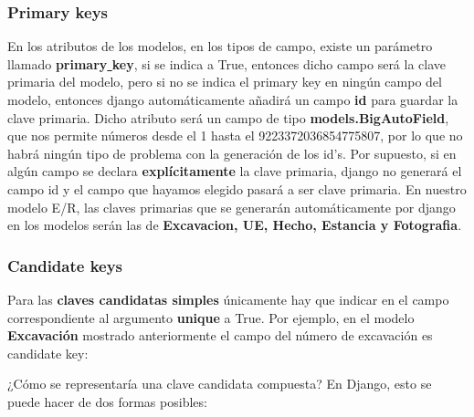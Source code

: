     \subsubsection{Primary keys}
    En los atributos de los modelos, en los tipos de campo, existe un parámetro llamado
    \textbf{primary\underline{ }key}, si se indica a True, entonces dicho campo será la clave
    primaria del modelo, pero si no se indica el primary key en ningún campo del modelo,
    entonces django automáticamente añadirá un campo \textbf{id} para guardar la clave primaria.
    Dicho atributo será un campo de tipo \textbf{models.BigAutoField}, que nos permite números
    desde el 1 hasta el 9223372036854775807, por lo que no habrá ningún tipo de problema con
    la generación de los id's. Por supuesto, si en algún campo se declara \textbf{explícitamente}
    la clave primaria, django no generará el campo id y el campo que hayamos elegido pasará a
    ser clave primaria. En nuestro modelo E/R, las claves primarias que se generarán
    automáticamente por django en los modelos serán las de \textbf{Excavacion, UE, Hecho,
    Estancia y Fotografia}. 
    
    \subsubsection{Candidate keys}
    Para las \textbf{claves candidatas simples} únicamente hay que indicar en el campo
    correspondiente al argumento \textbf{unique} a True. Por ejemplo, en el modelo
    \textbf{Excavación} mostrado anteriormente el campo del número de excavación es
    candidate key:
    

    ¿Cómo se representaría una clave candidata compuesta? En Django, esto se puede hacer de
    dos formas posibles:


